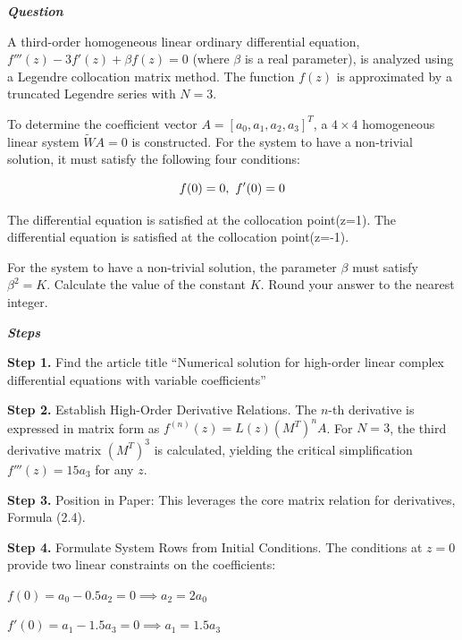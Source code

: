 \begin{tcolorbox}[
    breakable,
    title=Example of Scientific Deep Research in Math,
    colback=LighterGray,
    colframe=DeepPurple,
    colbacktitle=DeepPurple,
    coltitle=White,
]
\textbf{\emph{\textcolor{DeepPurple}{Question}}}

A third-order homogeneous linear ordinary differential equation, $f'''(z) - 3 f'(z) + \beta f(z) = 0$ (where $\beta$ is a real parameter), is analyzed using a Legendre collocation matrix method. The function $f(z)$ is approximated by a truncated Legendre series with $N=3$.

To determine the coefficient vector $A = [a_0, a_1, a_2, a_3]^T$, a $4\times4$ homogeneous linear system $\widetilde{W} A = 0$ is constructed. For the system to have a non-trivial solution, it must satisfy the following four conditions:

\[
f(0) = 0, \ f'(0) = 0 \\
\]

The differential equation is satisfied at the collocation point(z=1). The differential equation is satisfied at the collocation point(z=-1).

For the system to have a non-trivial solution, the parameter $\beta$ must satisfy $\beta^2 = K$. Calculate the value of the constant $K$. Round your answer to the nearest integer.

\textbf{\emph{\textcolor{DeepPurple}{Steps}}}

\textbf{\textcolor{CaseOrange}{Step 1.}} Find the article title ``Numerical solution for high-order linear complex differential equations with variable coefficients''

\textbf{\textcolor{CaseOrange}{Step 2.}} Establish High-Order Derivative Relations. The $n$-th derivative is expressed in matrix form as $f^{(n)}(z) = L(z)(M^T)^n A$. For $N=3$, the third derivative matrix $(M^T)^3$ is calculated, yielding the critical simplification $f'''(z) = 15a_3$ for any $z$.

\textbf{\textcolor{CaseOrange}{Step 3.}} Position in Paper: This leverages the core matrix relation for derivatives, Formula (2.4). 

\textbf{\textcolor{CaseOrange}{Step 4.}} Formulate System Rows from Initial Conditions. The conditions at $z=0$ provide two linear constraints on the coefficients:

$f(0) = a_0 - 0.5a_2 = 0 \implies a_2 = 2a_0$

$f'(0) = a_1 - 1.5a_3 = 0 \implies a_1 = 1.5a_3$


\end{tcolorbox}
